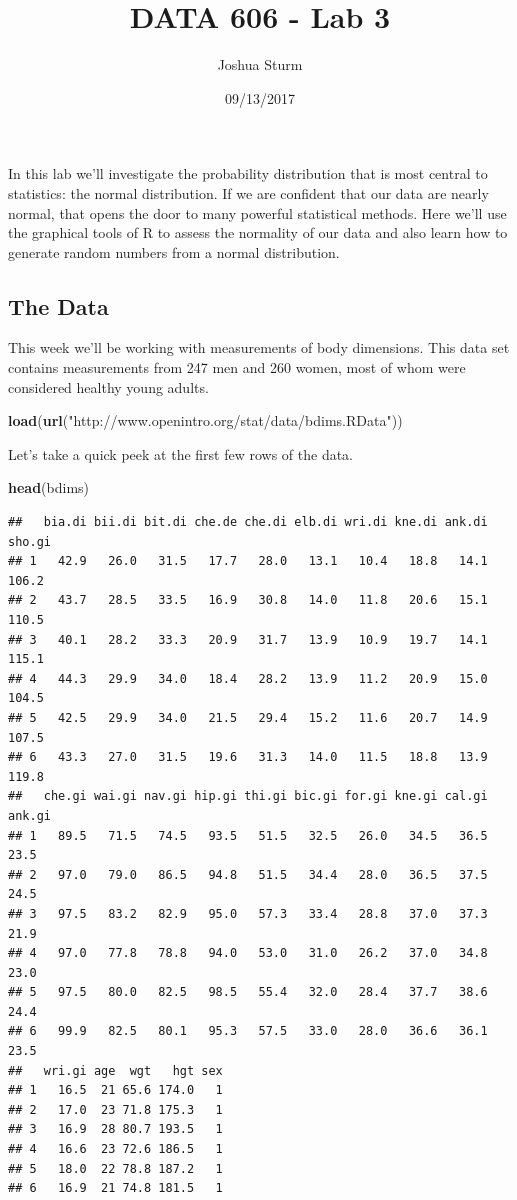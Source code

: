 \documentclass[]{article}
\title{DATA 606 - Lab 3}
\author{Joshua Sturm}
\date{09/13/2017}
\newenvironment{Shaded}{\begin{snugshade}}{\end{snugshade}}
\newcommand{\KeywordTok}[1]{\textcolor[rgb]{0.13,0.29,0.53}{\textbf{{#1}}}}
\newcommand{\StringTok}[1]{\textcolor[rgb]{0.31,0.60,0.02}{{#1}}}
\newcommand{\NormalTok}[1]{{#1}}
\begin{document}
\maketitle

In this lab we'll investigate the probability distribution that is most
central to statistics: the normal distribution. If we are confident that
our data are nearly normal, that opens the door to many powerful
statistical methods. Here we'll use the graphical tools of R to assess
the normality of our data and also learn how to generate random numbers
from a normal distribution.

\subsection{The Data}\label{the-data}

This week we'll be working with measurements of body dimensions. This
data set contains measurements from 247 men and 260 women, most of whom
were considered healthy young adults.

\begin{Shaded}
\begin{Highlighting}[]
\KeywordTok{load}\NormalTok{(}\KeywordTok{url}\NormalTok{(}\StringTok{"http://www.openintro.org/stat/data/bdims.RData"}\NormalTok{))}
\end{Highlighting}
\end{Shaded}

Let's take a quick peek at the first few rows of the data.

\begin{Shaded}
\begin{Highlighting}[]
\KeywordTok{head}\NormalTok{(bdims)}
\end{Highlighting}
\end{Shaded}

\begin{verbatim}
##   bia.di bii.di bit.di che.de che.di elb.di wri.di kne.di ank.di sho.gi
## 1   42.9   26.0   31.5   17.7   28.0   13.1   10.4   18.8   14.1  106.2
## 2   43.7   28.5   33.5   16.9   30.8   14.0   11.8   20.6   15.1  110.5
## 3   40.1   28.2   33.3   20.9   31.7   13.9   10.9   19.7   14.1  115.1
## 4   44.3   29.9   34.0   18.4   28.2   13.9   11.2   20.9   15.0  104.5
## 5   42.5   29.9   34.0   21.5   29.4   15.2   11.6   20.7   14.9  107.5
## 6   43.3   27.0   31.5   19.6   31.3   14.0   11.5   18.8   13.9  119.8
##   che.gi wai.gi nav.gi hip.gi thi.gi bic.gi for.gi kne.gi cal.gi ank.gi
## 1   89.5   71.5   74.5   93.5   51.5   32.5   26.0   34.5   36.5   23.5
## 2   97.0   79.0   86.5   94.8   51.5   34.4   28.0   36.5   37.5   24.5
## 3   97.5   83.2   82.9   95.0   57.3   33.4   28.8   37.0   37.3   21.9
## 4   97.0   77.8   78.8   94.0   53.0   31.0   26.2   37.0   34.8   23.0
## 5   97.5   80.0   82.5   98.5   55.4   32.0   28.4   37.7   38.6   24.4
## 6   99.9   82.5   80.1   95.3   57.5   33.0   28.0   36.6   36.1   23.5
##   wri.gi age  wgt   hgt sex
## 1   16.5  21 65.6 174.0   1
## 2   17.0  23 71.8 175.3   1
## 3   16.9  28 80.7 193.5   1
## 4   16.6  23 72.6 186.5   1
## 5   18.0  22 78.8 187.2   1
## 6   16.9  21 74.8 181.5   1
\end{verbatim}
\end{document}
